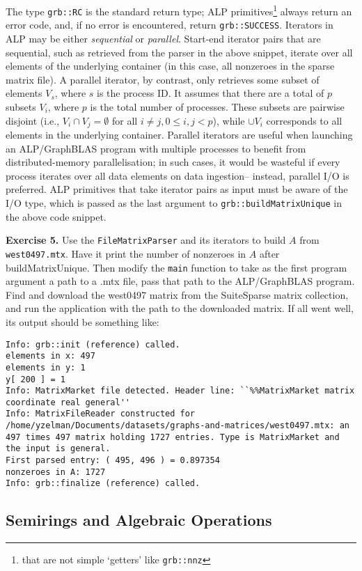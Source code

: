 The type \texttt{grb::RC} is the standard return type; ALP primitives\footnote{that are not simple `getters' like \texttt{grb::nnz}} always return an error code, and, if no error is encountered, return \texttt{grb::SUCCESS}. Iterators in ALP may be either \emph{sequential} or \emph{parallel}. Start-end iterator pairs that are sequential, such as retrieved from the parser in the above snippet, iterate over all elements of the underlying container (in this case, all nonzeroes in the sparse matrix file). A parallel iterator, by contrast, only retrieves some subset of elements $V_s$, where $s$ is the process ID. It assumes that there are a total of $p$ subsets $V_i$, where $p$ is the total number of processes. These subsets are pairwise disjoint (i.e., $V_i\cap V_j=\emptyset$ for all $i\neq j, 0\leq i,j<p$), while $\cup V_i$ corresponds to all elements in the underlying container. Parallel iterators are useful when launching an ALP/GraphBLAS program with multiple processes to benefit from distributed-memory parallelisation; in such cases, it would be wasteful if every process iterates over all data elements on data ingestion-- instead, parallel I/O is preferred. ALP primitives that take iterator pairs as input must be aware of the I/O type, which is passed as the last argument to \texttt{grb::buildMatrixUnique} in the above code snippet.

\textbf{Exercise 5.} Use the \texttt{FileMatrixParser} and its iterators to build $A$ from \texttt{west0497.mtx}. Have it print the number of nonzeroes in $A$ after buildMatrixUnique. Then modify the \texttt{main} function to take as the first program argument a path to a .mtx file, pass that path to the ALP/GraphBLAS program. Find and download the west0497 matrix from the SuiteSparse matrix collection, and run the application with the path to the downloaded matrix. If all went well, its output should be something like:
\begin{lstlisting}[keywordstyle=\ttfamily]
Info: grb::init (reference) called.
elements in x: 497
elements in y: 1
y[ 200 ] = 1
Info: MatrixMarket file detected. Header line: ``%%MatrixMarket matrix coordinate real general''
Info: MatrixFileReader constructed for /home/yzelman/Documents/datasets/graphs-and-matrices/west0497.mtx: an 497 times 497 matrix holding 1727 entries. Type is MatrixMarket and the input is general.
First parsed entry: ( 495, 496 ) = 0.897354
nonzeroes in A: 1727
Info: grb::finalize (reference) called.
\end{lstlisting}

\subsection{Semirings and Algebraic Operations}

